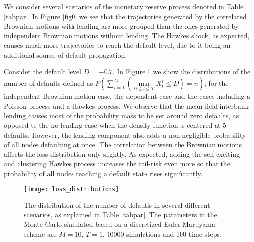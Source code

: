 \documentclass[10pt]{article}
\theoremstyle{plain}
\theoremstyle{definition}
\newcommand{\<}{\langle}
\renewcommand{\>}{\rangle}
\renewcommand{\(}{\left(}
\renewcommand{\)}{\right)}
\renewcommand{\[}{\left[}
\renewcommand{\]}{\right]}
\begin{document}
We consider several scenarios of the monetary reserve process denoted in Table \ref{tabpar}. In Figure \ref{fig0} we see that the trajectories generated by the correlated Brownian motions with lending are more grouped than the ones generated by independent Brownian motions without lending. The Hawkes shock, as expected, causes much more trajectories to reach the default level, due to it being an additional source of default propagation.

Consider the default level $D=-0.7$. In Figure \ref{fig1} we show the distributions of the number
of defaults defined as $P\left(\sum\limits_{i=1}^M\left(\min\limits_{0\leq t\leq T}X_t^i\leq
D\right)=n\right)$, for the independent Brownian motion case, the dependent case and the cases
including a Poisson process and a Hawkes process. We observe that the mean-field interbank lending
causes most of the probability mass to be set around zero defaults, as opposed to the no lending
case when the density function is centered at 5 defaults. However, the lending component also adds
a non-negligible probability of all nodes defaulting at once. The correlation between the Brownian
motions affects the loss distribution only slightly. As expected, adding the self-exciting and
clustering Hawkes process increases the tail-risk even more so that the probability of all nodes
reaching a default state rises significantly.

\begin{figure}[H]
\begin{center}
  \caption{The distribution of the number of defautls in several different scenarios, as explained in Table \ref{tabpar}. The parameters in the Monte Carlo simulated based on a discretized Euler-Maruyama scheme are $M=10$, $T=1$, 10000 simulations and 100 time steps.}\label{fig1}
    \texttt{[image: loss\_distributions]}
    \end{center}
\end{figure}
\end{document}
